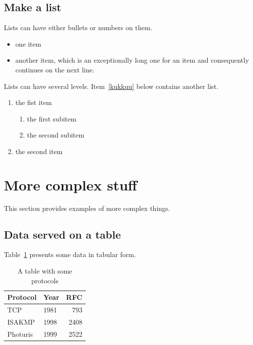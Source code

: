 \documentclass[a4paper,12pt]{article}
\begin{document}
\subsection{Make a list}\label{sec:list}

Lists can have either bullets or numbers on them. 

\begin{itemize}
\item one item
\item another item, which is an exceptionally long one for an item
  and consequently continues on the next line.
\end{itemize}

Lists can have several levels. Item~\ref{kukkuu} below contains
another list.
\begin{enumerate}
\item the fist item \label{kukkuu}
  \begin{enumerate}
  \item the first subitem 
  \item the second subitem
  \end{enumerate}
\item the second item
\end{enumerate}




\pagebreak[3]
\section{More complex stuff}

This section provides examples of more complex things. \cite{opengles_kronos}  




\subsection{Data served on a table}


Table~\ref{tab:mytable1} presents some data in tabular form. 

\begin{table}[t]
  \begin{center}
    \begin{tabular}{|l|lr|}
    \hline
    Protocol & Year &  RFC \\
    \hline
    TCP      & 1981 &  793 \\
    ISAKMP   & 1998 & 2408 \\
    Photuris & 1999 & 2522 \\
    \hline
    \end{tabular}
    \caption{A table with some protocols}
    \label{tab:mytable1}
  \end{center}
\end{table}
\end{document}
